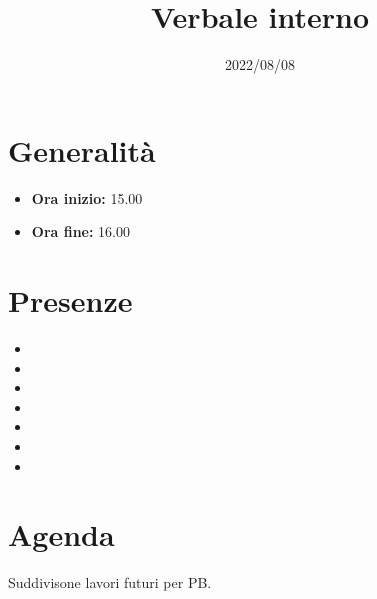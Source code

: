 \documentclass{classes/base}
\title{Verbale interno}
\date{2022/08/08}
\author{\marcob}
\renewcommand{\maketitle}{
    
}
\begin{document}
    \maketitle

    \section*{Generalità}
    \begin{itemize}
        \item \textbf{Ora inizio:} 15.00
        \item \textbf{Ora fine:} 16.00
    \end{itemize}

    \section*{Presenze}
    \begin{itemize}
    	\item \angela
        \item \marcob
        \item \matteo
        \item \marcov
        \item \giulio
        \item \ruth
        \item \tommaso
    \end{itemize}

    \section*{Agenda}
    Suddivisone lavori futuri per PB.
\end{document}
